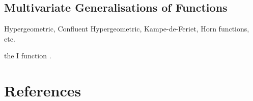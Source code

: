 \documentclass[journal=jcisd8,manuscript=article,layout=onecolumn,pdftex,floatfix,amsmath,amssymb,10pt]{achemso}
\begin{document}
\subsection{Multivariate Generalisations of Functions}
Hypergeometric, 
Confluent Hypergeometric,
Kampe-de-Feriet, Horn functions, etc.



the I function \cite{}.





\section{References}
\end{document}
